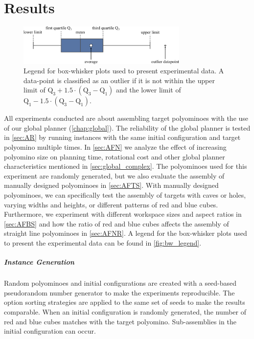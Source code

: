 \chapter{Results}
\label{chap:results}

\begin{figure}
	\centering
	\includegraphics[width=0.75\textwidth]{figures/plots/box_whisker_legend.pdf}
	\caption[Legend for box-whisker plots]{Legend for box-whisker plots used to present experimental data. A data-point is classified as an outlier if it is not within the upper limit of $\text{Q}_3 + 1.5\cdot(\text{Q}_3-\text{Q}_1)$ and the lower limit of $\text{Q}_1 - 1.5\cdot(\text{Q}_3-\text{Q}_1)$.}
	\label{fig:bw_legend}
\end{figure}

All experiments conducted are about assembling target polyominoes with the use of our global planner (\autoref{chap:global}).
The reliability of the global planner is tested in \autoref{sec:AR} by running instances with the same initial configuration and target polyomino multiple times.
In \autoref{sec:AFN} we analyze the effect of increasing polyomino size on planning time, rotational cost and other global planner characteristics mentioned in \autoref{sec:global_complex}.
The polyominoes used for this experiment are randomly generated, but we also evaluate the assembly of manually designed polyominoes in \autoref{sec:AFTS}.
With manually designed polyominoes, we can specifically test the assembly of targets with caves or holes, varying widths and heights, or different patterns of red and blue cubes. 
Furthermore, we experiment with different workspace sizes and aspect ratios in \autoref{sec:AFBS} and how the ratio of red and blue cubes affects the assembly of straight line polyominoes in \autoref{sec:AFNR}.
A legend for the box-whisker plots used to present the experimental data can be found in \autoref{fig:bw_legend}.

\paragraph{Instance Generation}
Random polyominoes and initial configurations are created with a seed-based pseudorandom number generator to make the experiments reproducible.
The option sorting strategies are applied to the same set of seeds to make the results comparable.
When an initial configuration is randomly generated, the number of red and blue cubes matches with the target polyomino.
Sub-assemblies in the initial configuration can occur.

